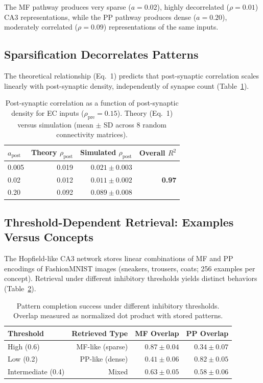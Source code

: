 \documentclass[11pt]{article}
\begin{document}
The MF pathway produces very sparse ($a = 0.02$), highly decorrelated ($\rho = 0.01$) CA3 representations, while the PP pathway produces dense ($a = 0.20$), moderately correlated ($\rho = 0.09$) representations of the same inputs.

\subsection{Sparsification Decorrelates Patterns}

The theoretical relationship (Eq.\ 1) predicts that post-synaptic correlation scales linearly with post-synaptic density, independently of synapse count (Table~\ref{tab:decorrelation}).

\begin{table}[H]
\centering
\caption{Post-synaptic correlation as a function of post-synaptic density for EC inputs ($\rho_\text{pre} = 0.15$). Theory (Eq.\ 1) versus simulation (mean $\pm$ SD across 8 random connectivity matrices).}
\label{tab:decorrelation}
\begin{tabular}{lrrr}
\toprule
\textbf{$a_\text{post}$} & \textbf{Theory $\rho_\text{post}$} & \textbf{Simulated $\rho_\text{post}$} & \textbf{Overall $R^2$} \\
\midrule
0.005 & 0.019 & $0.021 \pm 0.003$ & \multirow{3}{*}{\textbf{0.97}} \\
0.02 & 0.012 & $0.011 \pm 0.002$ & \\
0.20 & 0.092 & $0.089 \pm 0.008$ & \\
\bottomrule
\end{tabular}
\end{table}

\subsection{Threshold-Dependent Retrieval: Examples Versus Concepts}

The Hopfield-like CA3 network stores linear combinations of MF and PP encodings of FashionMNIST images (sneakers, trousers, coats; 256 examples per concept). Retrieval under different inhibitory thresholds yields distinct behaviors (Table~\ref{tab:retrieval}).

\begin{table}[H]
\centering
\caption{Pattern completion success under different inhibitory thresholds. Overlap measured as normalized dot product with stored patterns.}
\label{tab:retrieval}
\begin{tabular}{lrrr}
\toprule
\textbf{Threshold} & \textbf{Retrieved Type} & \textbf{MF Overlap} & \textbf{PP Overlap} \\
\midrule
High (0.6) & MF-like (sparse) & $0.87 \pm 0.04$ & $0.34 \pm 0.07$ \\
Low (0.2) & PP-like (dense) & $0.41 \pm 0.06$ & $0.82 \pm 0.05$ \\
Intermediate (0.4) & Mixed & $0.63 \pm 0.05$ & $0.58 \pm 0.06$ \\
\bottomrule
\end{tabular}
\end{table}
\end{document}
